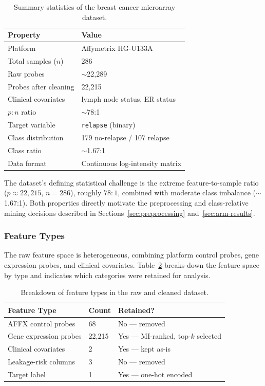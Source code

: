 \documentclass[twocolumn]{article}
\begin{document}
\begin{table}[h]
\centering
\small
\caption{Summary statistics of the breast cancer microarray dataset.}
\label{tab:data-stats}
\begin{tabular}{p{3.2cm}p{4.3cm}}
\toprule
\textbf{Property} & \textbf{Value} \\
\midrule
Platform & Affymetrix HG-U133A \\
Total samples ($n$) & 286 \\
Raw probes & $\sim$22{,}289 \\
Probes after cleaning & 22{,}215 \\
Clinical covariates & lymph node status, ER status \\
$p{:}n$ ratio & $\sim$78:1 \\
Target variable & \texttt{relapse} (binary) \\
Class distribution & 179 no-relapse / 107 relapse \\
Class ratio & $\sim$1.67:1 \\
Data format & Continuous log-intensity matrix \\
\bottomrule
\end{tabular}
\end{table}

The dataset's defining statistical challenge is the extreme feature-to-sample ratio
($p \approx 22{,}215$, $n = 286$), roughly $78{:}1$, combined with moderate class
imbalance ($\sim$1.67:1). Both properties directly motivate the preprocessing and
class-relative mining decisions described in Sections~\ref{sec:preprocessing}
and~\ref{sec:arm-results}.

\subsubsection{Feature Types}
The raw feature space is heterogeneous, combining platform control probes, gene
expression probes, and clinical covariates. Table~\ref{tab:feature-types} breaks down
the feature space by type and indicates which categories were retained for analysis.

\begin{table}[h]
\centering
\small
\caption{Breakdown of feature types in the raw and cleaned dataset.}
\label{tab:feature-types}
\begin{tabular}{p{2.6cm}p{1.6cm}p{3.0cm}}
\toprule
\textbf{Feature Type} & \textbf{Count} & \textbf{Retained?} \\
\midrule
AFFX control probes & 68 & No — removed \\
Gene expression probes & 22{,}215 & Yes — MI-ranked, top-$k$ selected \\
Clinical covariates & 2 & Yes — kept as-is \\
Leakage-risk columns & 3 & No — removed \\
Target label & 1 & Yes — one-hot encoded \\
\bottomrule
\end{tabular}
\end{table}
\end{document}
